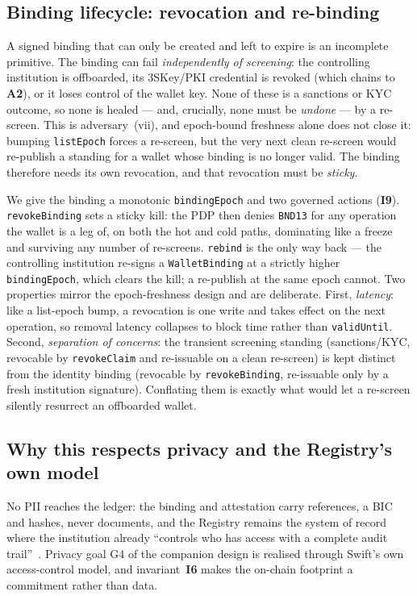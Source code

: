 \documentclass[11pt,a4paper]{article}
\newcommand{\Aref}[1]{\textbf{A#1}}
\newcommand{\Iref}[1]{\textbf{I#1}}
\begin{document}
\subsection{Binding lifecycle: revocation and re-binding}
\label{sec:binding-revocation}
A signed binding that can only be created and left to expire is an incomplete
primitive. The binding can fail \emph{independently of screening}: the controlling
institution is offboarded, its 3SKey/PKI credential is revoked (which chains to
\Aref{2}), or it loses control of the wallet key. None of these is a sanctions or
KYC outcome, so none is healed --- and, crucially, none must be \emph{undone} --- by
a re-screen. This is adversary~(vii), and epoch-bound freshness alone does not
close it: bumping \texttt{listEpoch} forces a re-screen, but the very next clean
re-screen would re-publish a standing for a wallet whose binding is no longer
valid. The binding therefore needs its own revocation, and that revocation must be
\emph{sticky}.

We give the binding a monotonic \texttt{bindingEpoch} and two governed actions
(\Iref{9}). \texttt{revokeBinding} sets a sticky kill: the PDP then denies
\texttt{BND13} for any operation the wallet is a leg of, on both the hot and cold
paths, dominating like a freeze and surviving any number of re-screens.
\texttt{rebind} is the only way back --- the controlling institution re-signs a
\texttt{WalletBinding} at a strictly higher \texttt{bindingEpoch}, which clears the
kill; a re-publish at the same epoch cannot. Two properties mirror the
epoch-freshness design and are deliberate. First, \emph{latency}: like a list-epoch
bump, a revocation is one write and takes effect on the next operation, so removal
latency collapses to block time rather than \texttt{validUntil}. Second,
\emph{separation of concerns}: the transient screening standing (sanctions/KYC,
revocable by \texttt{revokeClaim} and re-issuable on a clean re-screen) is kept
distinct from the identity binding (revocable by \texttt{revokeBinding}, re-issuable
only by a fresh institution signature). Conflating them is exactly what would let a
re-screen silently resurrect an offboarded wallet.

\subsection{Why this respects privacy and the Registry's own model}
No PII reaches the ledger: the binding and attestation carry references, a BIC and
hashes, never documents, and the Registry remains the system of record where the
institution already ``controls who has access with a complete audit
trail''~\cite{swiftkyc}. Privacy goal G4 of the companion design is realised
through Swift's own access-control model, and invariant~\Iref{6} makes the
on-chain footprint a commitment rather than data.
\end{document}
